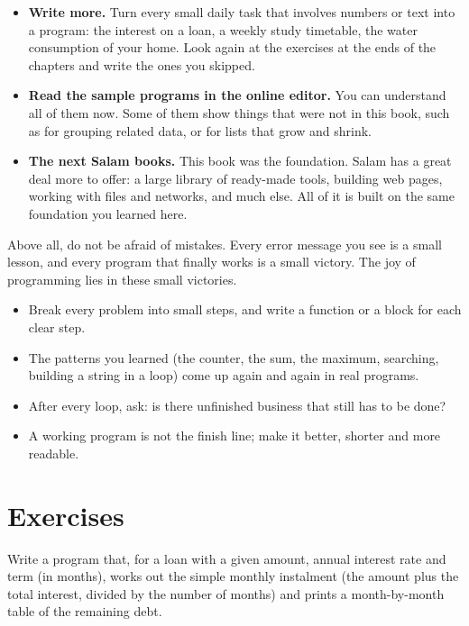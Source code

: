\begin{itemize}
  \item \textbf{Write more.} Turn every small daily task that involves
        numbers or text into a program: the interest on a loan, a weekly
        study timetable, the water consumption of your home. Look again at
        the exercises at the ends of the chapters and write the ones you
        skipped.
  \item \textbf{Read the sample programs in the online editor.} You can
        understand all of them now. Some of them show things that were not
        in this book, such as  for grouping related data, or
         for lists that grow and shrink.
  \item \textbf{The next Salam books.} This book was the foundation. Salam
        has a great deal more to offer: a large library of ready-made
        tools, building web pages, working with files and networks, and much
        else. All of it is built on the same foundation you learned here.
\end{itemize}

Above all, do not be afraid of mistakes. Every error message you see is a
small lesson, and every program that finally works is a small victory. The
joy of programming lies in these small victories.

\begin{summary}
\begin{itemize}
  \item Break every problem into small steps, and write a function or a
        block for each clear step.
  \item The patterns you learned (the counter, the sum, the maximum,
        searching, building a string in a loop) come up again and again in
        real programs.
  \item After every loop, ask: is there unfinished business that still has
        to be done?
  \item A working program is not the finish line; make it better, shorter
        and more readable.
\end{itemize}
\end{summary}

\section*{Exercises}

\exercise Write a program that, for a loan with a given amount, annual
interest rate and term (in months), works out the simple monthly instalment
(the amount plus the total interest, divided by the number of months) and
prints a month-by-month table of the remaining debt.

